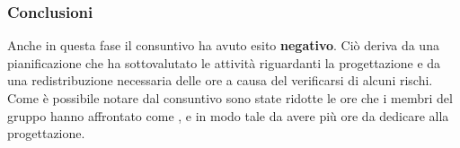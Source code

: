 \documentclass[../PianoProgetto.tex]{subfiles}
\begin{document}
	\subsubsection{Conclusioni}	
     Anche in questa fase il consuntivo ha avuto esito \textbf{negativo}. 
     Ciò deriva da una pianificazione che ha sottovalutato le attività riguardanti la progettazione e da una redistribuzione necessaria delle ore a causa del verificarsi di alcuni rischi. Come è possibile notare dal consuntivo sono state ridotte le ore che i membri del gruppo hanno affrontato come \verificatori, \amministratori e \responsabilediprogetto in modo tale da avere più ore da dedicare alla progettazione.
\end{document}
